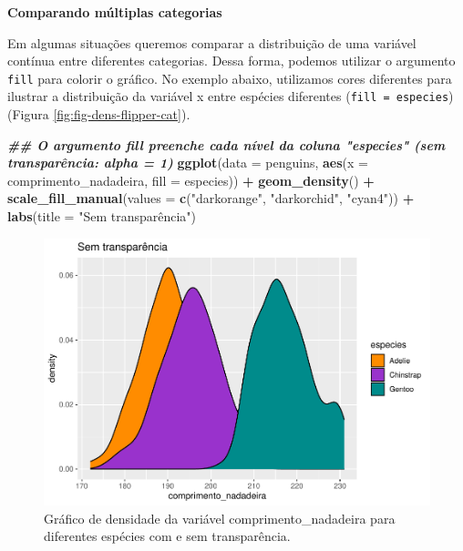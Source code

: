 \documentclass[
]{article}
\newenvironment{Shaded}{\begin{snugshade}}{\end{snugshade}}
\newcommand{\AttributeTok}[1]{\textcolor[rgb]{0.13,0.29,0.53}{#1}}
\newcommand{\DocumentationTok}[1]{\textcolor[rgb]{0.56,0.35,0.01}{\textbf{\textit{#1}}}}
\newcommand{\FunctionTok}[1]{\textcolor[rgb]{0.13,0.29,0.53}{\textbf{#1}}}
\newcommand{\NormalTok}[1]{#1}
\newcommand{\SpecialCharTok}[1]{\textcolor[rgb]{0.81,0.36,0.00}{\textbf{#1}}}
\newcommand{\StringTok}[1]{\textcolor[rgb]{0.31,0.60,0.02}{#1}}
\begin{document}
\textbf{Comparando múltiplas categorias}

Em algumas situações queremos comparar a distribuição de uma variável contínua entre diferentes categorias. Dessa forma, podemos utilizar o argumento \texttt{fill} para colorir o gráfico. No exemplo abaixo, utilizamos cores diferentes para ilustrar a distribuição da variável x entre espécies diferentes (\texttt{fill\ =\ especies}) (Figura \ref{fig:fig-dens-flipper-cat}).

\begin{Shaded}
\begin{Highlighting}[]
\DocumentationTok{\#\# O argumento fill preenche cada nível da coluna "especies" (sem transparência: alpha = 1)}
\FunctionTok{ggplot}\NormalTok{(}\AttributeTok{data =}\NormalTok{ penguins, }\FunctionTok{aes}\NormalTok{(}\AttributeTok{x =}\NormalTok{ comprimento\_nadadeira, }\AttributeTok{fill =}\NormalTok{ especies)) }\SpecialCharTok{+}
    \FunctionTok{geom\_density}\NormalTok{() }\SpecialCharTok{+}
    \FunctionTok{scale\_fill\_manual}\NormalTok{(}\AttributeTok{values =} \FunctionTok{c}\NormalTok{(}\StringTok{"darkorange"}\NormalTok{, }\StringTok{"darkorchid"}\NormalTok{, }\StringTok{"cyan4"}\NormalTok{)) }\SpecialCharTok{+}
    \FunctionTok{labs}\NormalTok{(}\AttributeTok{title =} \StringTok{"Sem transparência"}\NormalTok{)}
\end{Highlighting}
\end{Shaded}

\begin{figure}
\includegraphics[width=0.75\linewidth,height=0.75\textheight]{epr_files/figure-latex/fig-dens-flipper-cat-1} \caption{Gráfico de densidade da variável comprimento_nadadeira para diferentes espécies com e sem transparência.}\label{fig:fig-dens-flipper-cat-1}
\end{figure}
\end{document}
